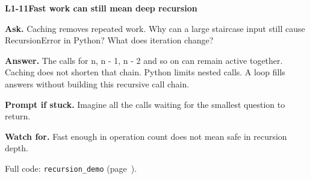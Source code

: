 \documentclass[11pt,a4paper]{article}
\begin{document}
\noindent\begin{minipage}{\textwidth}
{\color{teal}\textbf{L1-11}}\quad \textbf{Fast work can still mean deep recursion}\par\smallskip
\textbf{Ask.} Caching removes repeated work. Why can a large staircase input still cause RecursionError in Python? What does iteration change?\par\smallskip
\textbf{Answer.} The calls for n, n - 1, n - 2 and so on can remain active together. Caching does not shorten that chain. Python limits nested calls. A loop fills answers without building this recursive call chain.\par\smallskip
\textbf{Prompt if stuck.} Imagine all the calls waiting for the smallest question to return.\par\smallskip
\textbf{Watch for.} Fast enough in operation count does not mean safe in recursion depth.\par\smallskip Full code: \texttt{recursion\_demo} (page~\pageref{L1-code-recursion_demo}).
\end{minipage}\par{}\medskip
\end{document}
